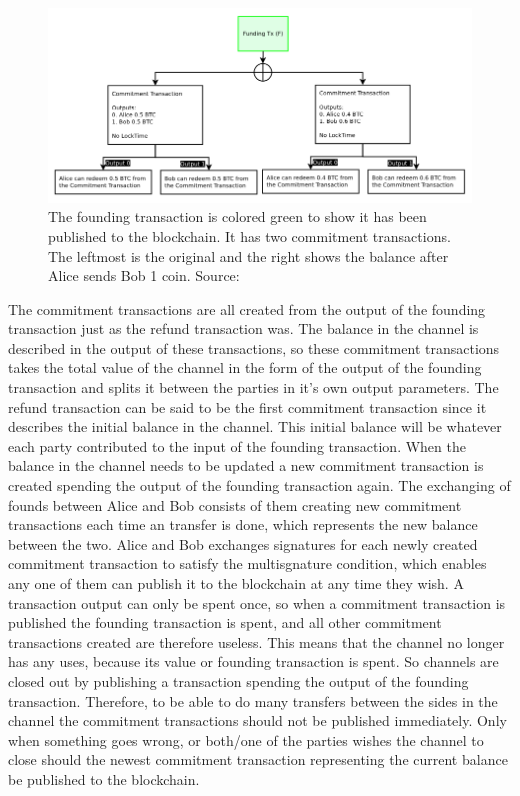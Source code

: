 \documentclass[informationsecurity]{gucmasterproject}
\begin{document}
\begin{figure}[h]
    \centering
    \includegraphics[width=12cm]{figs/ln_commit.png}
    \caption{The founding transaction is colored green to show it has been published to the blockchain. It has two commitment transactions. The leftmost is the original and the right shows the balance after Alice sends Bob 1 coin. Source: \cite{poon2015bitcoin}}
    \label{fig:ln_commit}
\end{figure}

The commitment transactions are all created from the output of the founding transaction just as the refund transaction was. The balance in the channel is described in the output of these transactions, so these commitment transactions takes the total value of the channel in the form of the output of the founding transaction and splits it between the parties in it's own output parameters. The refund transaction can be said to be the first commitment transaction since it describes the initial balance in the channel. This initial balance will be whatever each party contributed to the input of the founding transaction. When the balance in the channel needs to be updated a new commitment transaction is created spending the output of the founding transaction again. The exchanging of founds between Alice and Bob consists of them creating new commitment transactions each time an transfer is done, which represents the new balance between the two. Alice and Bob exchanges signatures for each newly created commitment transaction to satisfy the multisgnature condition, which enables any one of them can publish it to the blockchain at any time they wish. A transaction output can only be spent once, so when a commitment transaction is published the founding transaction is spent, and all other commitment transactions created are therefore useless. This means that the channel no longer has any uses, because its value or founding transaction is spent. So channels are closed out by publishing a transaction spending the output of the founding transaction. Therefore, to be able to do many transfers between the sides in the channel the commitment transactions should not be published immediately. Only when something goes wrong, or both/one of the parties wishes the channel to close should the newest commitment transaction representing the current balance be published to the blockchain. 
\end{document}
